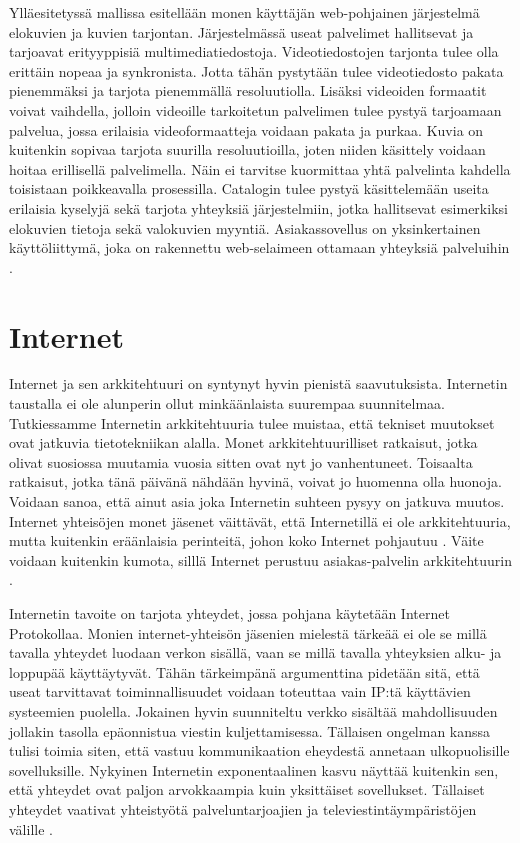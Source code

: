 \documentclass[utf8]{gradu3}
\begin{document}
Ylläesitetyssä mallissa esitellään monen käyttäjän web-pohjainen järjestelmä elokuvien ja kuvien tarjontan. Järjestelmässä useat palvelimet hallitsevat ja tarjoavat erityyppisiä multimediatiedostoja. Videotiedostojen tarjonta tulee olla erittäin nopeaa ja synkronista. Jotta tähän pystytään tulee videotiedosto pakata pienemmäksi ja tarjota pienemmällä resoluutiolla. Lisäksi videoiden formaatit voivat vaihdella, jolloin videoille tarkoitetun palvelimen tulee pystyä tarjoamaan palvelua, jossa erilaisia videoformaatteja voidaan pakata ja purkaa. Kuvia on kuitenkin sopivaa tarjota suurilla resoluutioilla, joten niiden käsittely voidaan hoitaa erillisellä palvelimella. Näin ei tarvitse kuormittaa yhtä palvelinta kahdella toisistaan poikkeavalla prosessilla. Catalogin tulee pystyä käsittelemään useita erilaisia kyselyjä sekä tarjota yhteyksiä järjestelmiin, jotka hallitsevat esimerkiksi elokuvien tietoja sekä valokuvien myyntiä. Asiakassovellus on yksinkertainen käyttöliittymä, joka on rakennettu web-selaimeen ottamaan yhteyksiä palveluihin \parencite[s. 163]{Sommerville}. 

\chapter{Internet}
Internet ja sen arkkitehtuuri on syntynyt hyvin pienistä saavutuksista. Internetin taustalla ei ole alunperin ollut minkäänlaista suurempaa suunnitelmaa. Tutkiessamme Internetin arkkitehtuuria tulee muistaa, että tekniset muutokset ovat jatkuvia tietotekniikan alalla. Monet arkkitehtuurilliset ratkaisut, jotka olivat suosiossa muutamia vuosia sitten ovat nyt jo vanhentuneet. Toisaalta ratkaisut, jotka tänä päivänä nähdään hyvinä, voivat jo huomenna olla huonoja. Voidaan sanoa, että ainut asia joka Internetin suhteen pysyy on jatkuva muutos. Internet yhteisöjen monet jäsenet väittävät, että Internetillä ei ole arkkitehtuuria, mutta kuitenkin eräänlaisia perinteitä, johon koko Internet pohjautuu \parencite{constant_change}. Väite voidaan kuitenkin kumota, silllä Internet perustuu asiakas-palvelin arkkitehtuurin \parencite[s. 162]{Sommerville}.
 
Internetin tavoite on tarjota yhteydet, jossa pohjana käytetään Internet Protokollaa. Monien internet-yhteisön jäsenien mielestä tärkeää ei ole se millä tavalla yhteydet luodaan verkon sisällä, vaan se millä tavalla yhteyksien alku- ja loppupää käyttäytyvät. Tähän tärkeimpänä argumenttina pidetään sitä, että useat tarvittavat toiminnallisuudet voidaan toteuttaa vain IP:tä käyttävien systeemien puolella. Jokainen hyvin suunniteltu verkko sisältää mahdollisuuden jollakin tasolla epäonnistua viestin kuljettamisessa. Tällaisen ongelman kanssa tulisi toimia siten, että vastuu kommunikaation eheydestä annetaan ulkopuolisille sovelluksille.  Nykyinen Internetin exponentaalinen kasvu näyttää kuitenkin sen, että yhteydet ovat paljon arvokkaampia kuin yksittäiset sovellukset. Tällaiset yhteydet vaativat yhteistyötä palveluntarjoajien ja televiestintäympäristöjen välille \parencite{constant_change}. 
\end{document}
